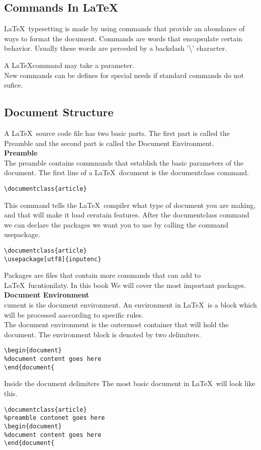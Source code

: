 \documentclass[12pt]{book}
\begin{document}
\subsection{Commands In \LaTeX \ }
\LaTeX \ typesetting is made by using commands that provide an abondance of ways to format the document. 
Commands are words that encapsulate certain behavior. Usually these words are perceded by a backslash 
'\textbackslash'  character.\par
A \LaTeX command may take a parameter. \\
New commands can be defines for special needs if standard commands do not sufice.

\subsection{Document Structure}
A \LaTeX \ source code file has two basic parts. The first part is called the Preamble and the second part is 
called the Document Environment.\\
\textbf{Preamble}\\
The preamble contains commnands that establish the basic parameters of the document.
The first line of a \LaTeX \ document is the documentclass command. 
\begin{lstlisting}[language={[latex]tex}]
\documentclass{article}
\end{lstlisting}
This command tells the \LaTeX \ compiler what type of document you are making, and that will make it load ceratain features.
After the documentclass command we can declare the packages we want you to use by calling the command usepackage.
\begin{lstlisting}[language={[latex]tex}]
\documentclass{article}
\usepackage[utf8]{inputenc}
\end{lstlisting}
Packages are files that contain more commands that can add to \LaTeX \ fucntionilaty. In this book We will cover the 
most important packages. 
\textbf{Document Environment}\\
cument is the document environment. An environment in \LaTeX \ is a block which will be processed aaccording to specific rules.\\ 
The document environment is the outermost container that will hold the
document. The environment block is denoted by two delimiters.
\begin{lstlisting}[language={[LaTeX]TeX}]
\begin{document}
%document content goes here
\end{document{
\end{lstlisting}
Inside the document delimiters 
The most basic document in \LaTeX \ will look like this.
\begin{lstlisting}[language={[LaTeX]TeX}]
\documentclass{article}
%preamble contonet goes here
\begin{document}
%document content goes here
\end{document{
\end{lstlisting}
\newpage
\end{document}
